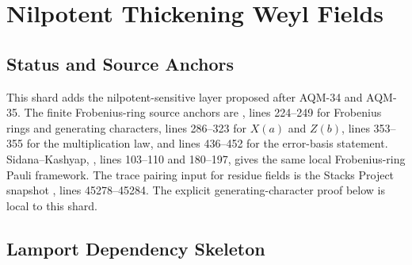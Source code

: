 
\section{Nilpotent Thickening Weyl Fields}
\label{sec:nilpotent-thickening-weyl-fields}

\subsection{Status and Source Anchors}

This shard adds the nilpotent-sensitive layer proposed after AQM-34 and
AQM-35.  The finite Frobenius-ring source anchors are
,
lines 224--249 for Frobenius rings and generating characters, lines
286--323 for \(X(a)\) and \(Z(b)\), lines 353--355 for the multiplication
law, and lines 436--452 for the error-basis statement.  Sidana--Kashyap,
,
lines 103--110 and 180--197, gives the same local Frobenius-ring Pauli
framework.  The trace pairing input for residue fields is the Stacks Project
snapshot ,
lines 45278--45284.  The explicit generating-character proof below is local
to this shard.

\subsection{Lamport Dependency Skeleton}

